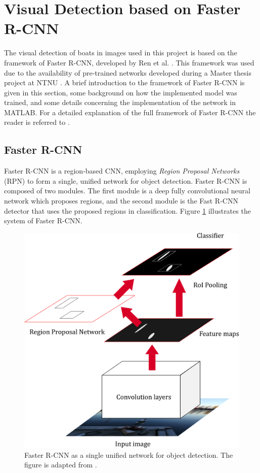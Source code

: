 \section{Visual Detection based on Faster R-CNN}
The visual detection of boats in images used in this project is based on the framework of Faster R-CNN, developed by Ren et al. \cite{ren15fasterrcnn}. This framework was used due to the availability of pre-trained networks developed during a Master thesis project at NTNU \cite{tangstad}. A brief introduction to the framework of Faster R-CNN is given in this section, some background on how the implemented model was trained, and some details concerning the implementation of the network in MATLAB. For a detailed explanation of the full framework of Faster R-CNN the reader is referred to \cite{ren15fasterrcnn}.
\subsection{Faster R-CNN}
Faster R-CNN is a region-based CNN, employing \textit{Region Proposal Networks} (RPN) to form a single, unified network for object detection. Faster R-CNN is composed of two modules. The first module is a deep fully convolutional neural network which proposes regions, and the second module is the Fast R-CNN detector \cite{Girshick_2015_ICCV} that uses the proposed regions in classification. Figure \ref{fig:faster_r_cnn} illustrates the system of Faster R-CNN.
\begin{figure}
	\centering
	\includegraphics[width=0.5\linewidth]{fig/faster_r_cnn_layers.png}
	\caption{Faster R-CNN as a single unified network for object detection. The figure is adapted from \cite{ren15fasterrcnn}.}
	\label{fig:faster_r_cnn}
\end{figure}
